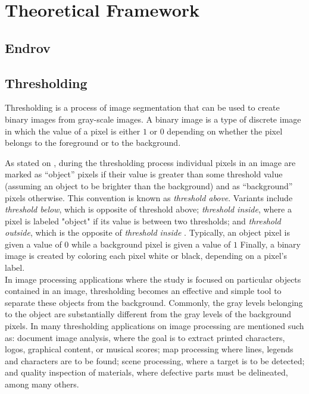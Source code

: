 \cleardoublepage
\chapter{Theoretical Framework}
\label{sec:dev}

\section{Endrov}
\label{sec:endrov}


\section{Thresholding}
\label{sec:thresholding}

Thresholding is a process of image segmentation that can be used to create
binary images from gray-scale images. A binary image is a type of discrete image in
 which the value of a pixel is either $1$ or $0$ depending on whether the pixel belongs
to the foreground or to the background.

As stated on \cite{web:thresholding}, during the thresholding process individual 
pixels in an image are marked as ``object'' pixels if 
their value is greater than some threshold value (assuming an object to be brighter than the 
background) and as ``background'' pixels otherwise. This convention is known as \emph{threshold above}. 
Variants include \emph{threshold below}, which is opposite of threshold above; \emph{threshold inside}, where a 
pixel is labeled "object" if its value is between two thresholds; and \emph{threshold outside}, which is 
the opposite of \emph{threshold inside} \cite{shapiro}. Typically, an object pixel is given 
a value of $0$ while a background pixel is given a value of $1$ Finally, a binary image is 
created by coloring each pixel white or black, depending on a pixel's label.\\

In image processing applications where the study is focused on particular objects contained
in an image, thresholding becomes an effective and simple tool to separate these objects from
the background. Commonly, the gray levels belonging to the object are substantially
different from the gray levels of the background pixels. In \cite[p.146]{thres} many thresholding
applications on image processing are mentioned such as: document image analysis, where the goal
is to extract printed characters, logos, graphical content, or musical scores; map processing
where lines, legends and characters are to be found; scene processing, where a target is to
be detected; and quality inspection of materials, where defective parts must be delineated,
among many others. \\

